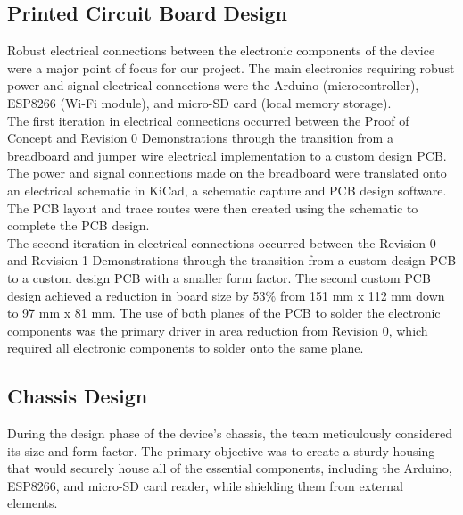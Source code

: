 \documentclass[12pt,titlepage]{article}
\begin{document}

\subsection{Printed Circuit Board Design}
Robust electrical connections between the electronic components of the device were a major point of focus for our project. The main electronics requiring robust power and signal electrical connections were the Arduino (microcontroller), ESP8266 (Wi-Fi module), and micro-SD card (local memory storage). \\

The first iteration in electrical connections occurred between the Proof of Concept and Revision 0 Demonstrations through the transition from a breadboard and jumper wire electrical implementation to a custom design PCB. The power and signal connections made on the breadboard were translated onto an electrical schematic in KiCad, a schematic capture and PCB design software. The PCB layout and trace routes were then created using the schematic to complete the PCB design. \\

The second iteration in electrical connections occurred between the Revision 0 and Revision 1 Demonstrations through the transition from a custom design PCB to a custom design PCB with a smaller form factor. The second custom PCB design achieved a reduction in board size by 53\% from 151 mm x 112 mm down to 97 mm x 81 mm. The use of both planes of the PCB to solder the electronic components was the primary driver in area reduction from Revision 0, which required all electronic components to solder onto the same plane. \\

\subsection{Chassis Design}
During the design phase of the device's chassis, the team meticulously considered its size and form factor. The primary objective was to create a sturdy housing that would securely house all of the essential components, including the Arduino, ESP8266, and micro-SD card reader, while shielding them from external elements.\\
\end{document}
